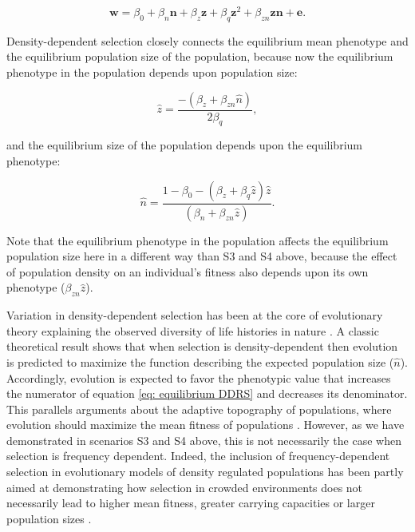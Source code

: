 \documentclass{article}
\begin{document}
\begin{equation} \label{eq: DDRS}
\bm{w}=\beta_{0} +\beta_{n} \bm{n} + \beta_{z} \bm{z} + \beta_{q} \bm{z}^2 +  \beta_{zn} \bm{zn}  +  \bm{e}.
\end{equation}

\noindent Density-dependent selection closely connects the equilibrium mean phenotype and the equilibrium population size of the population, because now the equilibrium phenotype in the population depends upon population size:

\begin{equation} 
\hat{z}=\frac{-(\beta_{z}+\beta_{zn}\hat{n})}{2\beta_{q}},
\end{equation} 

and the equilibrium size of the population depends upon the equilibrium phenotype:

\begin{equation} \label{eq: equilibrium DDRS}
		\hat{n} = \frac{1-\beta_{0}-(\beta_{z}  + \beta_{q}\hat{z})\hat{z}}{(\beta_{n} +  \beta_{zn} \hat{z})}.
\end{equation}

\noindent Note that the equilibrium phenotype in the population affects the equilibrium population size here in a different way than S3 and S4 above, because the effect of population density on an individual's fitness also depends upon its own phenotype ($\beta_{zn} \hat{z}$). 

Variation in density-dependent selection has been at the core of evolutionary theory explaining the observed diversity of life histories in nature \citep{Pianka1970,macarthur1967theory, Boyce1984, Mueller1991, Engen2013}. A classic theoretical result \citep{MacArthur1962, Engen2013} shows that when selection is density-dependent then evolution is predicted to maximize the function describing the expected population size ($\hat{n}$). Accordingly, evolution is expected to favor the phenotypic value that increases the numerator of equation \ref{eq: equilibrium DDRS} and decreases its denominator. This parallels arguments about the adaptive topography of populations, where evolution should maximize the mean fitness of populations \citep{Wright1931}. However, as we have demonstrated in scenarios S3 and S4 above, this is not necessarily the case when selection is frequency dependent. Indeed, the inclusion of frequency-dependent selection in evolutionary models of density regulated populations has been partly aimed at demonstrating how selection in crowded environments does not necessarily lead to higher mean fitness, greater carrying capacities or larger population sizes \citep{Clarke1972, Anderson1983, Engen2020}. 
\end{document}
